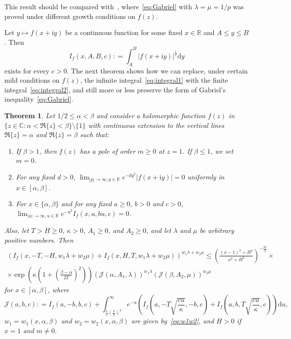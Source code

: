 \documentclass[a4paper,reqno]{amsart}
\newtheorem{theorem}{Theorem}
\theoremstyle{definition}
\newcommand{\R}{\mathbb{R}}
\newcommand{\C}{\mathbb{C}}
\newcommand{\de}[0]{\mathrel{\mathop:}=}
\newcommand{\ie}[0]{\mathrm{i}}
\newcommand{\dif}[1]{\mathrm{d}#1}
\begin{document}
This result should be compared with~\cite[Theorem 7]{HardyInghamPolya}, where~\eqref{eq:Gabriel} with $\lambda=\mu=1/p$ was proved under different growth conditions on $f(z)$. 

Let $y\mapsto f(x+\ie y)$ be a continuous function for some fixed $x\in\R$ and $A\leq y\leq B$. Then
\begin{equation}
\label{eq:integral2}
I_{f}(x,A,B,c) \de \int_{A}^{B}\left|f(x+\ie y)\right|^{\frac{1}{c}}\dif{y}
\end{equation}
exists for every $c>0$. The next theorem shows how we can replace, under certain mild conditions on $f(z)$, the infinite integral~\eqref{eq:integral1} with the finite integral~\eqref{eq:integral2}, and still more or less preserve the form of Gabriel's inequality~\eqref{eq:Gabriel}. 

\begin{theorem}
\label{thm:FXbyGabriel}
Let $1/2\leq\alpha<\beta$ and consider a holomorphic function $f(z)$ in $\{z\in\C\colon \alpha<\Re\{z\}<\beta\}\setminus\{1\}$ with continuous extension to the vertical lines $\Re\{z\}=\alpha$ and $\Re\{z\}=\beta$ such that:
\begin{enumerate}
    \item If $\beta>1$, then $f(z)$ has a pole of order $m\geq0$ at $z=1$. If $\beta\leq 1$, we set $m=0$.
    \item For any fixed $d>0$, $\lim_{|y|\to\infty,y\in\R}e^{-dy^2}|f(x+\ie y)|=0$ uniformly in $x\in[\alpha,\beta]$.
    \item For $x\in\{\alpha,\beta\}$ and for any fixed $a\geq0$, $b>0$ and $c>0$, $\lim_{|u|\to\infty,u\in\R}e^{-u^2}I_{f}(x,a,bu,c)=0$.
\end{enumerate}
Also, let $T>H\geq 0$, $\kappa>0$, $A_1\geq 0$, and $A_2\geq 0$, and let $\lambda$ and $\mu$ be arbitrary positive numbers. Then
\begin{multline}
\label{eq:FXbyGabriel}
\left(I_{f}\left(x,-T,-H,w_{1}\lambda+w_{2}\mu\right)+I_{f}\left(x,H,T,w_{1}\lambda+w_{2}\mu\right)\right)^{w_{1}\lambda+w_{2}\mu} \leq \left(\frac{(x-1)^2+H^2}{x^2+H^2}\right)^{-\frac{m}{2}}\times \\
\times\exp{\left(\kappa\left(1+\left(\frac{\beta-\alpha}{2T}\right)^{2}\right)\right)}\left(\mathcal{J}(\alpha,A_1,\lambda)\right)^{w_1\lambda}\left(\mathcal{J}(\beta,A_2,\mu)\right)^{w_2\mu}
\end{multline}
for $x\in[\alpha,\beta]$, where
\begin{equation}
\label{eq:FXbyGabrielJ}
\mathcal{J}(a,b,c) \de I_{f}(a,-b,b,c)+\int_{\frac{\kappa}{c}\left(\frac{b}{T}\right)^2}^{\infty}e^{-u}\left(I_{f}\left(a,-T\sqrt{\frac{cu}{\kappa}},-b,c\right)+I_{f}\left(a,b,T\sqrt{\frac{cu}{\kappa}},c\right)\right)\dif{u},
\end{equation}
$w_1=w_1(x,\alpha,\beta)$ and $w_2=w_2(x,\alpha,\beta)$ are given by~\eqref{eq:w1w2}, and $H>0$ if $x=1$ and $m\neq0$.
\end{theorem}
\end{document}
